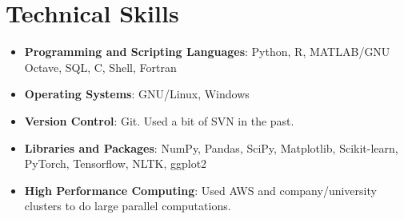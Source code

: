 \documentclass[letterpaper,11pt]{article}
\newcommand{\resumeItem}[2]{
	\item\small{
		\textbf{#1}{: #2 \vspace{-2pt}}
	}
}
\newcommand{\resumeSubItem}[2]{\resumeItem{#1}{#2}\vspace{-4pt}}
\newcommand{\resumeSubHeadingListStart}{\begin{itemize}[leftmargin=*]}
\newcommand{\resumeSubHeadingListEnd}{\end{itemize}}
\begin{document}
	\section{Technical Skills}
	\resumeSubHeadingListStart
	\resumeSubItem{Programming and Scripting Languages}
	{Python, R, MATLAB/GNU Octave, SQL, C, Shell, Fortran}
	\resumeSubItem{Operating Systems}
	{GNU/Linux, Windows}
	\resumeSubItem{Version Control}
	{Git. Used a bit of SVN in the past.}
	\resumeSubItem{Libraries and Packages}
	{NumPy, Pandas, SciPy, Matplotlib, Scikit-learn, PyTorch, Tensorflow, NLTK, ggplot2}
	\resumeSubItem{High Performance Computing}
	{Used AWS and company/university clusters to do large parallel computations.}
	\resumeSubHeadingListEnd
	
\end{document}
